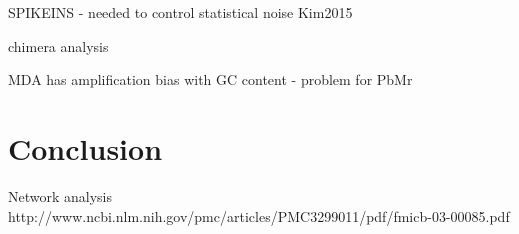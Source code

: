 SPIKEINS - needed to control statistical noise Kim2015

chimera analysis


MDA has amplification bias with GC content - problem for PbMr \citep{Macaulay2014}



\section{Conclusion}


Network analysis
http://www.ncbi.nlm.nih.gov/pmc/articles/PMC3299011/pdf/fmicb-03-00085.pdf



